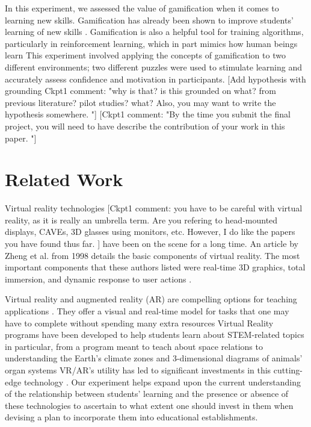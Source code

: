 \documentclass[manuscript,screen,review]{acmart}
\begin{document}
In this experiment, we assessed the value of gamification when it comes to learning new skills. Gamification has already been shown to improve students’ learning of new skills \cite{loureiro2020virtual, perez2022can, ausburn2008effects}. Gamification is also a helpful tool for training algorithms, particularly in reinforcement learning, which in part mimics how human beings learn \cite{agostinelli2019solving} This experiment involved applying the concepts of gamification to two different environments; two different puzzles were used to stimulate learning and accurately assess confidence and motivation in participants. [Add hypothesis with grounding Ckpt1 comment: "why is that? is this grounded on what?  from previous literature? pilot studies? what? Also, you may want to write the hypothesis somewhere. "] [Ckpt1 comment: "By the time you submit the final project, you will need to have describe the contribution of your work in this paper. "]

\section{Related Work}
Virtual reality technologies [Ckpt1 comment: you have to be careful with virtual reality, as it is really an umbrella term. Are you refering to head-mounted displays, CAVEs, 3D glasses using monitors, etc. However, I do like the papers you have found thus far. ] have been on the scene for a long time. An article by Zheng et al. \cite{zheng1998virtual} from 1998 details the basic components of virtual reality. The most important components that these authors listed were real-time 3D graphics, total immersion, and dynamic response to user actions \cite{zheng1998virtual}. 

Virtual reality and augmented reality (AR) are compelling options for teaching applications \cite{mahmoud2020does, brown2019an, bricken1991virtual, villagrasa2014teaching}. They offer a visual and real-time model for tasks that one may have to complete without spending many extra resources \cite{mahmoud2020does} Virtual Reality programs have been developed to help students learn about STEM-related topics in particular, from a program meant to teach about space relations to understanding the Earth’s climate zones and 3-dimensional diagrams of animals’ organ systems \cite{oberdorfer2021mutual} VR/AR’s utility has led to significant investments in this cutting-edge technology \cite{martin2022multimodality, oberdorfer2021mutual}. Our experiment helps expand upon the current understanding of the relationship between students’ learning and the presence or absence of these technologies to ascertain to what extent one should invest in them when devising a plan to incorporate them into educational establishments.
\end{document}
